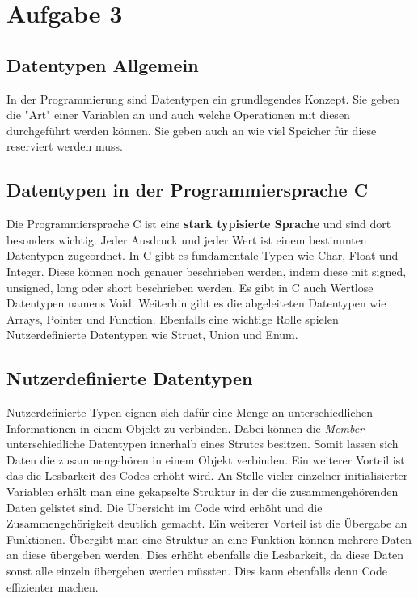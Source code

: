 \chapter{Aufgabe 3}
\section{Datentypen Allgemein}
In der Programmierung sind Datentypen ein grundlegendes Konzept.
Sie geben die "Art" einer Variablen an und auch welche Operationen mit diesen durchgeführt werden können.
Sie geben auch an wie viel Speicher für diese reserviert werden muss\cite{datentypen:2022}. 

\section{Datentypen in der Programmiersprache C}
Die Programmiersprache C ist eine \textbf{stark typisierte Sprache} und sind dort besonders wichtig.
Jeder Ausdruck und jeder Wert ist einem bestimmten Datentypen zugeordnet.
In C gibt es fundamentale Typen wie Char, Float und Integer.
Diese können noch genauer beschrieben werden, indem diese mit signed, unsigned, long oder short beschrieben werden.
Es gibt in C auch Wertlose Datentypen namens Void.
Weiterhin gibt es die abgeleiteten Datentypen wie Arrays, Pointer und Function.
Ebenfalls eine wichtige Rolle spielen Nutzerdefinierte Datentypen wie Struct, Union und Enum\cite{boekelmann:2023}.

\section{Nutzerdefinierte Datentypen}
Nutzerdefinierte Typen eignen sich dafür eine Menge an unterschiedlichen Informationen in einem Objekt zu verbinden.
Dabei können die \textit{Member} unterschiedliche Datentypen innerhalb eines Strutcs besitzen\cite{boekelmann:2023}.
Somit lassen sich Daten die zusammengehören in einem Objekt verbinden.
Ein weiterer Vorteil ist das die Lesbarkeit des Codes erhöht wird.
An Stelle vieler einzelner initialisierter Variablen erhält man eine gekapselte Struktur in der die zusammengehörenden Daten gelistet sind.
Die Übersicht im Code wird erhöht und die Zusammengehörigkeit deutlich gemacht.
Ein weiterer Vorteil ist die Übergabe an Funktionen.
Übergibt man eine Struktur an eine Funktion können mehrere Daten an diese übergeben werden.
Dies erhöht ebenfalls die Lesbarkeit, da diese Daten sonst alle einzeln übergeben werden müssten.
Dies kann ebenfalls denn Code effizienter machen.

